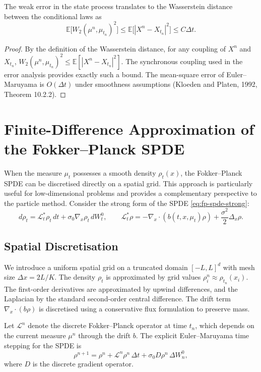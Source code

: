 \begin{lemma}
\label{lem:weak-error-propagation}
The weak error in the state process translates to the Wasserstein distance between
the conditional laws as
\[
    \mathbb{E}\big[ W_2(\mu^n, \mu_{t_n})^2 \big] \leq \mathbb{E}\big[ |X^n -
    X_{t_n}|^2 \big] \leq C \Delta t.
\]
\end{lemma}

\begin{proof}
By the definition of the Wasserstein distance, for any coupling of $X^n$ and
$X_{t_n}$, $W_2(\mu^n, \mu_{t_n})^2 \leq \mathbb{E}[|X^n - X_{t_n}|^2]$. The
synchronous coupling used in the error analysis provides exactly such a bound. The
mean-square error of Euler--Maruyama is $O(\Delta t)$ under smoothness assumptions
(Kloeden and Platen, 1992, Theorem 10.2.2).
\end{proof}


\section{Finite-Difference Approximation of the Fokker--Planck SPDE}
\label{sec:na-fd-spde}

When the measure $\mu_t$ possesses a smooth density $\rho_t(x)$, the Fokker--Planck
SPDE can be discretised directly on a spatial grid. This approach is particularly
useful for low-dimensional problems and provides a complementary perspective to the
particle method. Consider the strong form of the SPDE \eqref{eq:fp-spde-strong}:
\[
    d\rho_t = \mathcal{L}_t^* \rho_t\, dt + \sigma_0 \nabla_x \rho_t\, dW_t^0, \qquad
    \mathcal{L}_t^* \rho = -\nabla_x \cdot (b(t,x,\mu_t)\rho) + \frac{\sigma^2}{2}
    \Delta_x \rho.
\]

\subsection{Spatial Discretisation}

We introduce a uniform spatial grid on a truncated domain $[-L, L]^d$ with mesh size
$\Delta x = 2L/K$. The density $\rho_t$ is approximated by grid values
$\rho_i^n \approx \rho_{t_n}(x_i)$. The first-order derivatives are approximated by
upwind differences, and the Laplacian by the standard second-order central difference.
The drift term $\nabla_x \cdot (b\rho)$ is discretised using a conservative flux
formulation to preserve mass.

Let $\mathcal{L}^n$ denote the discrete Fokker--Planck operator at time $t_n$, which
depends on the current measure $\mu^n$ through the drift $b$. The explicit
Euler--Maruyama time stepping for the SPDE is
\begin{equation}
    \rho^{n+1} = \rho^n + \mathcal{L}^n \rho^n\, \Delta t + \sigma_0 D \rho^n\,
    \Delta W_n^0,
    \label{eq:discrete-fp-spde}
\end{equation}
where $D$ is the discrete gradient operator.

